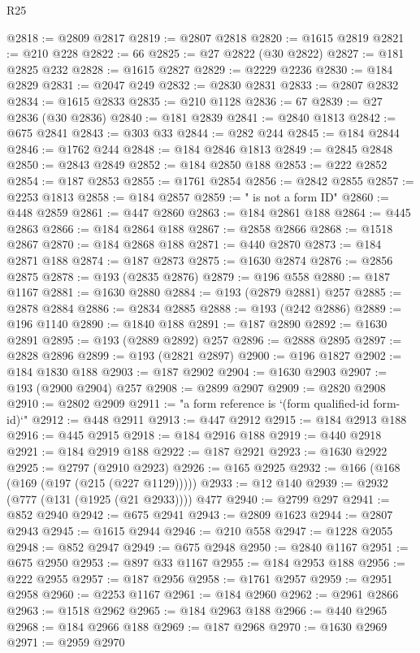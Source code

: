 \begin{lexlean}{R25}
\begin{coremodule}
@2818 := @2809 @2817
@2819 := @2807 @2818
@2820 := @1615 @2819
@2821 := @210 @228
@2822 := 66
@2825 := @27 @2822 (@30 @2822)
@2827 := @181 @2825 @232
@2828 := @1615 @2827
@2829 := @2229 @2236
@2830 := @184 @2829
@2831 := @2047 @249
@2832 := @2830 @2831
@2833 := @2807 @2832
@2834 := @1615 @2833
@2835 := @210 @1128
@2836 := 67
@2839 := @27 @2836 (@30 @2836)
@2840 := @181 @2839
@2841 := @2840 @1813
@2842 := @675 @2841
@2843 := @303 @33
@2844 := @282 @244
@2845 := @184 @2844
@2846 := @1762 @244
@2848 := @184 @2846 @1813
@2849 := @2845 @2848
@2850 := @2843 @2849
@2852 := @184 @2850 @188
@2853 := @222 @2852
@2854 := @187 @2853
@2855 := @1761 @2854
@2856 := @2842 @2855
@2857 := @2253 @1813
@2858 := @184 @2857
@2859 := " is not a form ID"
@2860 := @448 @2859
@2861 := @447 @2860
@2863 := @184 @2861 @188
@2864 := @445 @2863
@2866 := @184 @2864 @188
@2867 := @2858 @2866
@2868 := @1518 @2867
@2870 := @184 @2868 @188
@2871 := @440 @2870
@2873 := @184 @2871 @188
@2874 := @187 @2873
@2875 := @1630 @2874
@2876 := @2856 @2875
@2878 := @193 (@2835 @2876)
@2879 := @196 @558
@2880 := @187 @1167
@2881 := @1630 @2880
@2884 := @193 (@2879 @2881) @257
@2885 := @2878 @2884
@2886 := @2834 @2885
@2888 := @193 (@242 @2886)
@2889 := @196 @1140
@2890 := @1840 @188
@2891 := @187 @2890
@2892 := @1630 @2891
@2895 := @193 (@2889 @2892) @257
@2896 := @2888 @2895
@2897 := @2828 @2896
@2899 := @193 (@2821 @2897)
@2900 := @196 @1827
@2902 := @184 @1830 @188
@2903 := @187 @2902
@2904 := @1630 @2903
@2907 := @193 (@2900 @2904) @257
@2908 := @2899 @2907
@2909 := @2820 @2908
@2910 := @2802 @2909
@2911 := "a form reference is `(form qualified-id form-id)`"
@2912 := @448 @2911
@2913 := @447 @2912
@2915 := @184 @2913 @188
@2916 := @445 @2915
@2918 := @184 @2916 @188
@2919 := @440 @2918
@2921 := @184 @2919 @188
@2922 := @187 @2921
@2923 := @1630 @2922
@2925 := @2797 (@2910 @2923)
@2926 := @165 @2925
@2932 := @166 (@168 (@169 (@197 (@215 (@227 @1129)))))
@2933 := @12 @140
@2939 := @2932 (@777 (@131 (@1925 (@21 @2933)))) @477
@2940 := @2799 @297
@2941 := @852 @2940
@2942 := @675 @2941
@2943 := @2809 @1623
@2944 := @2807 @2943
@2945 := @1615 @2944
@2946 := @210 @558
@2947 := @1228 @2055
@2948 := @852 @2947
@2949 := @675 @2948
@2950 := @2840 @1167
@2951 := @675 @2950
@2953 := @897 @33 @1167
@2955 := @184 @2953 @188
@2956 := @222 @2955
@2957 := @187 @2956
@2958 := @1761 @2957
@2959 := @2951 @2958
@2960 := @2253 @1167
@2961 := @184 @2960
@2962 := @2961 @2866
@2963 := @1518 @2962
@2965 := @184 @2963 @188
@2966 := @440 @2965
@2968 := @184 @2966 @188
@2969 := @187 @2968
@2970 := @1630 @2969
@2971 := @2959 @2970

\end{coremodule}
\end{lexlean}
